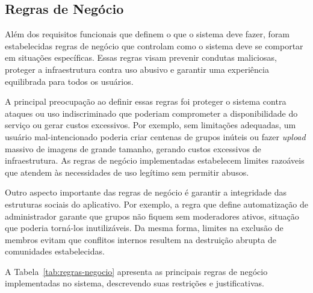 \subsection{Regras de Negócio}

Além dos requisitos funcionais que definem o que o sistema deve fazer, foram es\-ta\-be\-le\-ci\-das regras de negócio que controlam como o sistema deve se comportar em situações específicas. Essas regras visam prevenir condutas maliciosas, proteger a infraestrutura contra uso abusivo e garantir uma experiência equilibrada para todos os usuários.

A principal preocupação ao definir essas regras foi proteger o sistema contra ataques ou uso indiscriminado que poderiam comprometer a disponibilidade do serviço ou gerar custos excessivos. Por exemplo, sem limitações adequadas, um usuário mal-intencionado poderia criar centenas de grupos inúteis ou fazer \textit{upload} massivo de imagens de grande tamanho, gerando custos excessivos de infraestrutura. As regras de negócio implementadas estabelecem limites razoáveis que atendem às necessidades de uso legítimo sem permitir abusos.

Outro aspecto importante das regras de negócio é garantir a integridade das estruturas sociais do aplicativo. Por exemplo, a regra que define automatização de administrador garante que grupos não fiquem sem moderadores ativos, situação que poderia torná-los inutilizáveis. Da mesma forma, limites na exclusão de membros evitam que conflitos internos resultem na destruição abrupta de comunidades estabelecidas.

A Tabela~\ref{tab:regras-negocio} apresenta as principais regras de negócio implementadas no sistema, des\-cre\-ven\-do suas restrições e justificativas.

